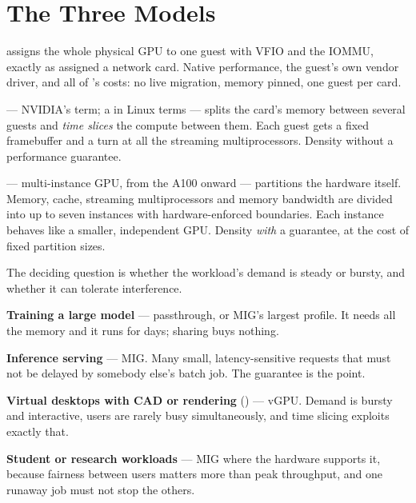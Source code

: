 \section{The Three Models}

\begin{definitionbox}
 assigns the whole physical GPU to one guest with VFIO and
the IOMMU, exactly as  assigned a network card. Native
performance, the guest's own vendor driver, and all of 's
costs: no live migration, memory pinned, one guest per card.

\smallskip
{} --- NVIDIA's term; a  in Linux terms --- splits
the card's memory between several guests and \emph{time slices} the compute
between them. Each guest gets a fixed framebuffer and a turn at all the
streaming multiprocessors. Density without a performance guarantee.

\smallskip
{} --- multi-instance GPU, from the A100 onward --- partitions the
hardware itself. Memory, cache, streaming multiprocessors and memory bandwidth
are divided into up to seven instances with hardware-enforced boundaries. Each
instance behaves like a smaller, independent GPU. Density \emph{with} a
guarantee, at the cost of fixed partition sizes.
\end{definitionbox}

\begin{conceptbox}
The deciding question is whether the workload's demand is steady or bursty, and
whether it can tolerate interference.

\begin{tight}
  \item \textbf{Training a large model} --- passthrough, or MIG's largest
        profile. It needs all the memory and it runs for days; sharing buys
        nothing.
  \item \textbf{Inference serving} --- MIG. Many small, latency-sensitive
        requests that must not be delayed by somebody else's batch job. The
        guarantee is the point.
  \item \textbf{Virtual desktops with CAD or rendering} () ---
        vGPU. Demand is bursty and interactive, users are rarely busy
        simultaneously, and time slicing exploits exactly that.
  \item \textbf{Student or research workloads} --- MIG where the hardware
        supports it, because fairness between users matters more than peak
        throughput, and one runaway job must not stop the others.
\end{tight}
\end{conceptbox}

